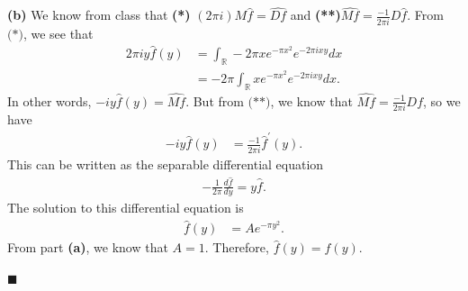 \documentclass[12pt]{article}
\begin{document}
\vspace{5mm}

\noindent\textbf{(b)} We know from class that \textbf{(*)} $(2\pi i)M\hat{f} = \widehat{Df}$ and \textbf{(**)}$\widehat{Mf} =  \frac{-1}{2\pi i}D\hat{f}.$ From $\textbf{(*)}$, we see that
\begin{align}
    2\pi i y \hat{f}(y) &= \int_{\mathbb{R}} -2\pi x e^{-\pi x^2}e^{-2\pi i x y} dx \\
    &= -2\pi\int_{\mathbb{R}}xe^{-\pi x^2} e^{-2\pi ixy} dx.
\end{align}
In other words, $-iy\hat{f}(y) = \widehat{Mf}.$ But from $\textbf{(**)}$, we know that $\widehat{Mf} = \frac{-1}{2\pi i}Df$, so we have
\begin{align}
    -iy\hat{f}(y) &= \frac{-1}{2\pi i}\hat{f}^{\prime}(y).
\end{align}
This can be written as the separable differential equation
\begin{align}
    -\frac{1}{2\pi}\frac{d\hat{f}}{dy} = y\hat{f}.
\end{align}
The solution to this differential equation is 
\begin{align}
    \hat{f}(y) &= Ae^{-\pi y^2}.
\end{align}
From part \textbf{(a)}, we know that $A = 1$. Therefore, $\hat{f}(y) = f(y).$

\hfill$\blacksquare$

\vfill

\begin{center}
\\
\vspace{2mm}
\vspace{-0.65cm}
\hrulefill \\
\vspace{-0.95cm}
\hrulefill
\end{center}
\end{document}
